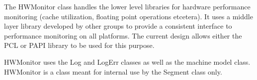 %



The HWMonitor class handles the lower level libraries for
hardware performance monitoring (cache utilization, floating point operations
etcetera). It uses a middle layer library developed by other groups to provide 
a consistent interface to performance monitoring on all platforms. The current
design allows either the PCL or PAPI library to be used for this purpose. 

HWMonitor uses the Log and LogErr classes as well as the machine model class.
HWMonitor is a class meant for internal use by the Segment class only.
